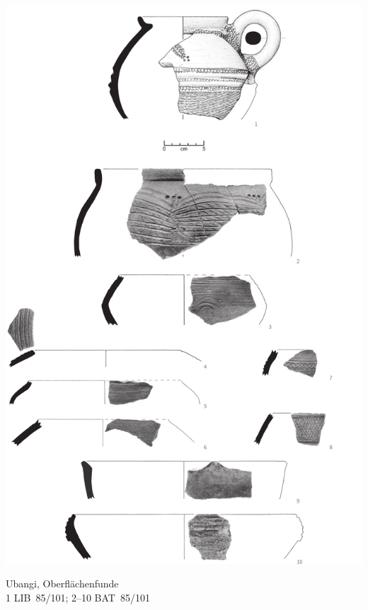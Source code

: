 \begin{pl}[H]
	\includegraphics{plt/Taf16.pdf}
	\vspace{.75em}\caption{\mbox{Ubangi}, Oberflächenfunde \\ 1 LIB~85/101; 2--10 BAT~85/101}
	\label{pl:16}
\end{pl}

